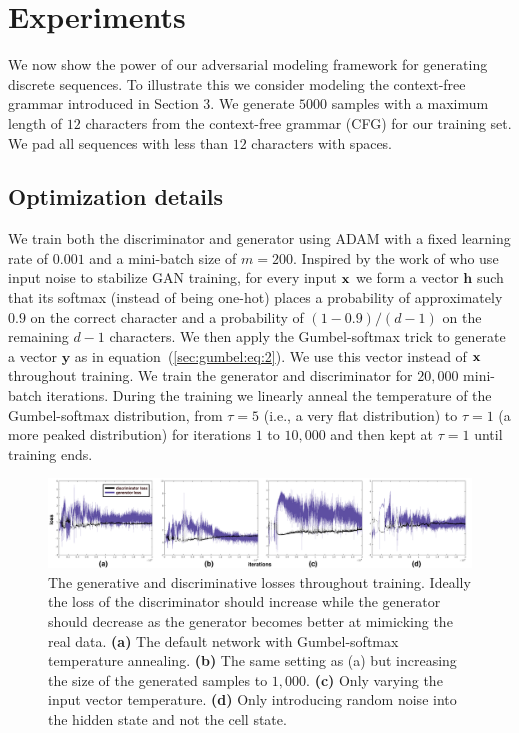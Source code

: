\section{Experiments}
We now show the power of our adversarial modeling framework for generating discrete sequences. To illustrate this we consider modeling the context-free grammar introduced in Section 3. We generate $5000$ samples with a maximum length of $12$ characters from the context-free grammar (CFG) for our training set. We pad all sequences with less than $12$ characters with spaces.

\subsection*{Optimization details}
We train both the discriminator and generator using ADAM \cite{kingma2014adam} with a fixed learning rate of $0.001$ and a mini-batch size of $m\!=\!200$. Inspired by the work of \cite{sonderby2016amortised} who use input noise to stabilize GAN training, for every input $\mathbf{x}$ we form a vector $\mathbf{h}$ such that its softmax (instead of being one-hot) places a probability of approximately $0.9$ on the correct character and a probability of $(1-0.9)/(d-1)$ on the remaining $d\!-\!1$ characters. We then apply the Gumbel-softmax trick to generate a vector $\mathbf{y}$ as in equation~(\ref{sec:gumbel:eq:2}). We use this vector instead of $\mathbf{x}$ throughout training. We train the generator and discriminator for $20,000$ mini-batch iterations. During the training we linearly anneal the temperature of the Gumbel-softmax distribution, from $\tau\!=\!5$ (i.e., a very flat distribution) to $\tau\!=\!1$ (a more peaked distribution) for iterations $1$ to $10,000$ and then kept at $\tau\!=\!1$ until training ends. 


\begin{figure}[t!]
\begin{center}
\centerline{\includegraphics[width=\textwidth]{gan_losses.pdf}}
\vspace{-2ex}
\caption{The generative and discriminative losses throughout training. Ideally the loss of the discriminator should increase while the generator should decrease as the generator becomes better at mimicking the real data. \textbf{(a)} The default network with Gumbel-softmax temperature annealing. \textbf{(b)} The same setting as (a) but increasing the size of the generated samples to $1,000$. \textbf{(c)} Only varying the input vector temperature. \textbf{(d)} Only introducing random noise into the hidden state and not the cell state.}
\label{figure.losses}
\end{center}
\end{figure}

